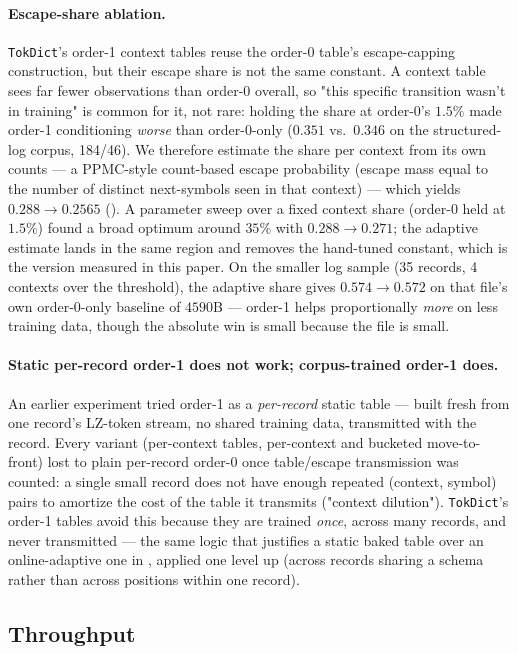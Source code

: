 \documentclass[10pt,twocolumn]{article}
\theoremstyle{plain}
\theoremstyle{definition}
\begin{document}
\paragraph{Escape-share ablation.} \texttt{TokDict}'s order-1 context tables reuse the
order-0 table's escape-capping construction, but their escape share is not the same
constant. A context table sees far fewer observations than order-0 overall, so "this
specific transition wasn't in training" is common for it, not rare: holding the share
at order-0's $1.5\%$ made order-1 conditioning \emph{worse} than order-0-only
($0.351$ vs.\ $0.346$ on the structured-log corpus, 184/46). We therefore estimate the
share per context from its own counts --- a PPMC-style count-based escape probability
(escape mass equal to the number of distinct next-symbols seen in that context) ---
which yields $0.288 \to \mathbf{0.2565}$ (). A parameter sweep
over a fixed context share (order-0 held at $1.5\%$) found a broad optimum around
$35\%$ with $0.288 \to 0.271$; the adaptive estimate lands in the same region and
removes the hand-tuned constant, which is the version measured in this paper. On the
smaller log sample (35 records, 4 contexts over the threshold), the adaptive share
gives $0.574 \to 0.572$ on that file's own order-0-only baseline of $4590$B ---
order-1 helps proportionally \emph{more} on less training data, though the absolute
win is small because the file is small.

\paragraph{Static per-record order-1 does not work; corpus-trained order-1 does.} An
earlier experiment tried order-1 as a \emph{per-record} static table --- built fresh
from one record's LZ-token stream, no shared training data, transmitted with the
record. Every variant (per-context tables, per-context and bucketed move-to-front)
lost to plain per-record order-0 once table/escape transmission was counted: a single
small record does not have enough repeated (context, symbol) pairs to amortize the
cost of the table it transmits ("context dilution"). \texttt{TokDict}'s order-1 tables
avoid this because they are trained \emph{once}, across many records, and never
transmitted --- the same logic that justifies a static baked table over an
online-adaptive one in , applied one level up (across records sharing a
schema rather than across positions within one record).

\subsection{Throughput}\label{sec:speed}
\end{document}
